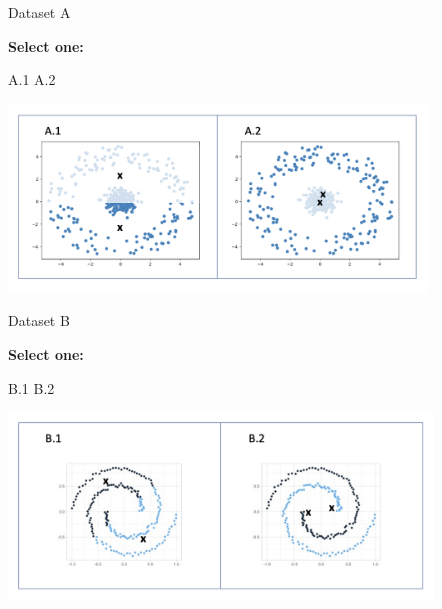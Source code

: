 \documentclass[11pt,addpoints,answers]{exam}
\newcommand{\sone}{\textbf{Select one: }}
\begin{document}
\begin{questions}
\begin{parts}
\begin{subparts}
\subpart[1] Dataset A

\begin{minipage}{.2\textwidth}
    \sone
    
    \begin{checkboxes}
    \CorrectChoice A.1
    \choice A.2
    \end{checkboxes}
\end{minipage}
\begin{minipage}{.75\textwidth}
\includegraphics[width=.9\linewidth, height=5cm]{figures/4.1a.png}
\end{minipage}



\subpart[1] Dataset B

\begin{minipage}{.2\textwidth}
    \sone
    
    \begin{checkboxes}
    \CorrectChoice B.1
    \choice B.2
    \end{checkboxes}
\end{minipage}
\begin{minipage}{.75\textwidth}
\includegraphics[width=.9\linewidth, height=5cm]{figures/4.1b.png}
\end{minipage}

\end{subparts}


\end{parts}
\end{questions}
\end{document}
